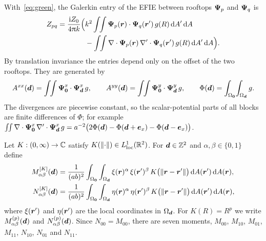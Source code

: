  With~\eqref{eq:green}, the Galerkin entry of the \acs{EFIE} between rooftops
$\vb*{\Psi}_p$ and $\vb*{\Psi}_q$ is~\cite{machacek2025method}
\begin{equation}
    \label{eq:zpq}
    \begin{split}
    Z_{pq} = \frac{\mathrm{i} Z_0}{4\uppi k}\Bigl( & k^2 \int\!\!\int \vb*{\Psi}_p(\vb*{r})\cdot\vb*{\Psi}_q(\vb*{r}')\,g(R)\,\mathrm{d} A'\,\mathrm{d} A\\
    & - \int\!\!\int \nabla\cdot\vb*{\Psi}_p(\vb*{r})\,\nabla'\cdot\vb*{\Psi}_q(\vb*{r}')\,g(R)\,\mathrm{d} A'\,\mathrm{d} A \Bigr).
    \end{split}
\end{equation}
By translation invariance the entries depend only on the offset of the two rooftops. They are generated by
\begin{equation}
    A^{xx}(\vb*{d}) = \int\!\!\int \vb*{\Psi}^x_{\vb*{0}}\cdot\vb*{\Psi}^x_{\vb*{d}}\,g, \qquad
    A^{yy}(\vb*{d}) = \int\!\!\int \vb*{\Psi}^y_{\vb*{0}}\cdot\vb*{\Psi}^y_{\vb*{d}}\,g, \qquad
    \Phi(\vb*{d})  = \int_{\Omega_{\vb*{0}}}\!\int_{\Omega_{\vb*{d}}} g .
\end{equation}
The divergences are piecewise constant, so the scalar-potential parts of all blocks are finite differences of $\Phi$; for
example
$\int\!\!\int \nabla\cdot\vb*{\Psi}^x_{\vb*{0}}\,\nabla'\cdot\vb*{\Psi}^x_{\vb*{d}}\,g
= a^{-2}\bigl(2\Phi(\vb*{d})-\Phi(\vb*{d}+\vb*{e}_x)-\Phi(\vb*{d}-\vb*{e}_x)\bigr)$.

 Let $K:(0,\infty)\to\mathbb{C}$ satisfy $K(\left\| \cdot \right\|)\in L^1_{\mathrm{loc}}(\mathbb{R}^2)$. For
$\vb*{d}\in\mathbb{Z}^2$ and $\alpha,\beta\in\{0,1\}$ define
\begin{equation}
    \begin{aligned}
    M^{[K]}_{\alpha\beta}(\vb*{d}) &= \frac{1}{(ab)^2}\int_{\Omega_{\vb*{0}}}\int_{\Omega_{\vb*{d}}}
        \xi(\vb*{r})^{\alpha}\,\xi(\vb*{r}')^{\beta}\,K\bigl(\left\| \vb*{r}-\vb*{r}' \right\|\bigr)\,\mathrm{d} A(\vb*{r}')\,\mathrm{d} A(\vb*{r}), \\
    N^{[K]}_{\alpha\beta}(\vb*{d}) &= \frac{1}{(ab)^2}\int_{\Omega_{\vb*{0}}}\int_{\Omega_{\vb*{d}}}
        \eta(\vb*{r})^{\alpha}\,\eta(\vb*{r}')^{\beta}\,K\bigl(\left\| \vb*{r}-\vb*{r}' \right\|\bigr)\,\mathrm{d} A(\vb*{r}')\,\mathrm{d} A(\vb*{r}),
    \end{aligned}
\end{equation}
where $\xi(\vb*{r}')$ and $\eta(\vb*{r}')$ are the local coordinates in $\Omega_{\vb*{d}}$. For $K(R)=R^p$ we write $M^{(p)}_{\alpha\beta}(\vb*{d})$
and $N^{(p)}_{\alpha\beta}(\vb*{d})$. Since $N_{00}=M_{00}$, there are seven moments, $M_{00}$, $M_{10}$, $M_{01}$,
$M_{11}$, $N_{10}$, $N_{01}$ and $N_{11}$.

